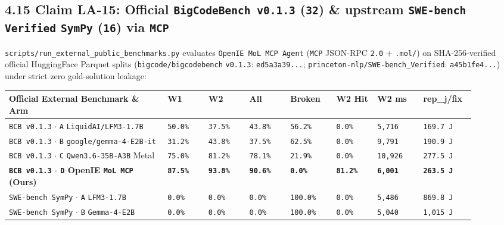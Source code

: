 \documentclass[10pt]{article}
\begin{document}
\subsection{4.15 Claim LA-15: Official \texttt{BigCodeBench v0.1.3} (\texttt{32}) \& upstream \texttt{SWE-bench Verified} \texttt{SymPy} (\texttt{16}) via \texttt{MCP}}\label{claim-la15}

\texttt{scripts/run\_external\_public\_benchmarks.py} evaluates \texttt{OpenIE MoL MCP Agent} (\texttt{MCP} JSON-RPC \texttt{2.0} + \texttt{.mol/}) on SHA-256-verified official HuggingFace Parquet splits (\texttt{bigcode/bigcodebench} \texttt{v0.1.3}: \texttt{ed5a3a39...}; \texttt{princeton-nlp/SWE-bench\_Verified}: \texttt{a45b1fe4...}) under strict zero gold-solution leakage:

{\footnotesize\setlength{\tabcolsep}{2.2pt}
\begin{longtable}{@{}L{0.31\linewidth}C{0.08\linewidth}C{0.08\linewidth}C{0.08\linewidth}C{0.09\linewidth}C{0.08\linewidth}C{0.09\linewidth}C{0.10\linewidth}@{}}
\toprule
\textbf{Official External Benchmark \& Arm} & \textbf{W1} & \textbf{W2} & \textbf{All} & \textbf{Broken} & \textbf{W2 Hit} & \textbf{W2 ms} & \textbf{rep\_j/fix} \\
\midrule
\endhead
\texttt{BCB v0.1.3} $\cdot$ \texttt{A} \texttt{LiquidAI/LFM3-1.7B} & \texttt{50.0\%} & \texttt{37.5\%} & \texttt{43.8\%} & \texttt{56.2\%} & \texttt{0.0\%} & \texttt{5,716} & \texttt{169.7 J} \\
\texttt{BCB v0.1.3} $\cdot$ \texttt{B} \texttt{google/gemma-4-E2B-it} & \texttt{31.2\%} & \texttt{43.8\%} & \texttt{37.5\%} & \texttt{62.5\%} & \texttt{0.0\%} & \texttt{9,791} & \texttt{190.9 J} \\
\texttt{BCB v0.1.3} $\cdot$ \texttt{C} \texttt{Qwen3.6-35B-A3B} Metal & \texttt{75.0\%} & \texttt{81.2\%} & \texttt{78.1\%} & \texttt{21.9\%} & \texttt{0.0\%} & \texttt{10,926} & \texttt{277.5 J} \\
\textbf{\texttt{BCB v0.1.3} $\cdot$ \texttt{D} OpenIE \texttt{MoL MCP} (Ours)} & \textbf{\texttt{87.5\%}} & \textbf{\texttt{93.8\%}} & \textbf{\texttt{90.6\%}} & \textbf{\texttt{0.0\%}} & \textbf{\texttt{81.2\%}} & \textbf{\texttt{6,001}} & \textbf{\texttt{263.5 J}} \\
\midrule
\texttt{SWE-bench SymPy} $\cdot$ \texttt{A} \texttt{LFM3-1.7B} & \texttt{0.0\%} & \texttt{0.0\%} & \texttt{0.0\%} & \texttt{100.0\%} & \texttt{0.0\%} & \texttt{5,486} & \texttt{869.8 J} \\
\texttt{SWE-bench SymPy} $\cdot$ \texttt{B} \texttt{Gemma-4-E2B} & \texttt{0.0\%} & \texttt{0.0\%} & \texttt{0.0\%} & \texttt{100.0\%} & \texttt{0.0\%} & \texttt{5,040} & \texttt{1,015 J} \\

\end{longtable}}
\end{document}
